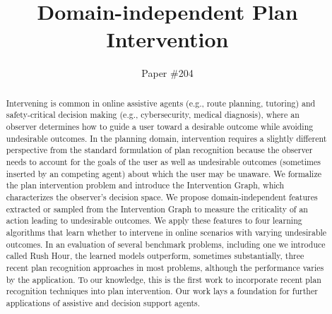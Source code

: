 \documentclass[letterpaper]{article}
\theoremstyle{plain}
\begin{document}
\title{Domain-independent Plan Intervention}
\author{ Paper \#204}
\newcommand{\debug}[2]{[\textbf{DEBUG #1}: \textcolor{WildStrawberry}{\textit{#2}}]}
\nocopyright
\maketitle
\begin{abstract}
Intervening is common in online assistive agents (e.g., route planning, tutoring) and safety-critical decision making (e.g., cybersecurity, medical diagnosis), where an observer determines how to guide a user toward a desirable outcome while avoiding undesirable outcomes.
In the planning domain, intervention requires a slightly different perspective from the standard formulation of plan recognition because the observer needs to account for the goals of the user as well as undesirable outcomes (sometimes inserted by an competing agent) about which the user may be unaware.
We formalize the plan intervention problem and introduce the Intervention Graph, which characterizes the observer's decision space.
We propose domain-independent features extracted or sampled from the Intervention Graph to measure the criticality of an action leading to undesirable outcomes.
We apply these features to four learning algorithms that learn whether to intervene in online scenarios with varying undesirable outcomes.
In an evaluation of several benchmark problems, including one we introduce called Rush Hour,
the learned models outperform, sometimes substantially, three recent plan recognition approaches in most problems, although the performance varies by the application.
To our knowledge, this is the first work to incorporate recent plan recognition techniques into plan intervention.
Our work lays a foundation for further applications of assistive and decision support agents.
\end{abstract}
\end{document}
